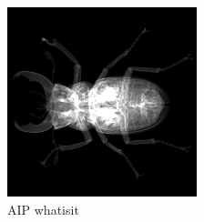\documentclass{article}
\begin{document}
\begin{figure}[h]
\centerline{\includegraphics[scale=0.7]{./sortiet1whatisitmoy.png}}
\caption{AIP whatisit}
\end{figure}
\end{document}
